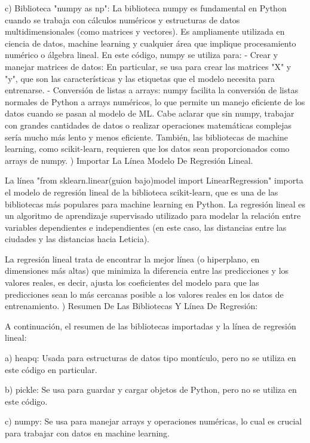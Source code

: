 \documentclass[conference]{IEEEtran}
\begin{document}
\begin{itemize}
	c) Biblioteca "numpy as np": La biblioteca numpy es fundamental en Python cuando se trabaja con cálculos numéricos y estructuras de datos multidimensionales (como matrices y vectores). Es ampliamente utilizada en ciencia de datos, machine learning y cualquier área que implique procesamiento numérico o álgebra lineal. En este código, numpy se utiliza para: - Crear y manejar matrices de datos: En particular, se usa para crear las matrices "X" y "y", que son las características y las etiquetas que el modelo necesita para entrenarse. - Conversión de listas a arrays: numpy facilita la conversión de listas normales de Python a arrays numéricos, lo que permite un manejo eficiente de los datos cuando se pasan al modelo de ML. Cabe aclarar que sin numpy, trabajar con grandes cantidades de datos o realizar operaciones matemáticas complejas sería mucho más lento y menos eficiente. También, las bibliotecas de machine learning, como scikit-learn, requieren que los datos sean proporcionados como arrays de numpy.
	) Importar La Línea Modelo De Regresión Lineal.
	
	La línea "from sklearn.linear(guion bajo)model import LinearRegression" importa el modelo de regresión lineal de la biblioteca scikit-learn, que es una de las bibliotecas más populares para machine learning en Python. La regresión lineal es un algoritmo de aprendizaje supervisado utilizado para modelar la relación entre variables dependientes e independientes (en este caso, las distancias entre las ciudades y las distancias hacia Leticia).
	
	La regresión lineal trata de encontrar la mejor línea (o hiperplano, en dimensiones más altas) que minimiza la diferencia entre las predicciones y los valores reales, es decir, ajusta los coeficientes del modelo para que las predicciones sean lo más cercanas posible a los valores reales en los datos de entrenamiento.
	) Resumen De Las Bibliotecas Y Línea De Regresión:
	
	A continuación, el resumen de las bibliotecas importadas y la línea de regresión lineal: 
	
	a) heapq: Usada para estructuras de datos tipo montículo, pero no se utiliza en este código en particular.
	
	b) pickle: Se usa para guardar y cargar objetos de Python, pero no se utiliza en este código.
	
	c) numpy: Se usa para manejar arrays y operaciones numéricas, lo cual es crucial para trabajar con datos en machine learning.
	

\end{itemize}
\end{document}
